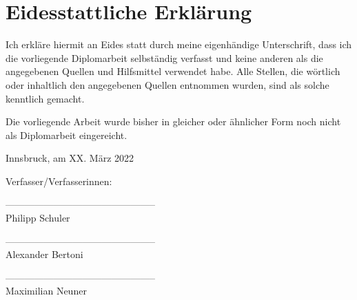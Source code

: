 \section*{Eidesstattliche Erklärung}

Ich erkläre hiermit an Eides statt durch meine eigenhändige Unterschrift, dass ich die vorliegende Diplomarbeit selbständig verfasst und keine anderen als die angegebenen Quellen und Hilfsmittel verwendet habe. Alle Stellen, die wörtlich oder inhaltlich den angegebenen Quellen entnommen wurden, sind als solche kenntlich gemacht.

Die vorliegende Arbeit wurde bisher in gleicher oder ähnlicher Form noch nicht als Diplomarbeit eingereicht.

Innsbruck, am XX. März 2022

\vspace*{3cm}


Verfasser/Verfasserinnen:

\vspace*{2cm}


-----------------------------------------------\\
\hspace*{1.3cm}           Philipp Schuler

\vspace*{2cm}


-----------------------------------------------\\
\hspace*{1.3cm}           Alexander Bertoni

\vspace*{2cm}


-----------------------------------------------\\
\hspace*{1.3cm}           Maximilian Neuner


\newpage
